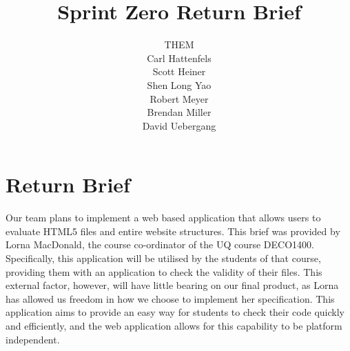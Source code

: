 \documentclass[12pt]{article}
\title{\bf Sprint Zero Return Brief}
\author{THEM \\ Carl Hattenfels \\ Scott Heiner \\ Shen Long Yao \\ Robert Meyer \\ Brendan Miller \\ David Uebergang}
\begin{document}
\maketitle

\section*{Return Brief}

Our team plans to implement a web based application that allows users to evaluate HTML5 files and entire website structures. This brief was provided by Lorna MacDonald, the course co-ordinator of the UQ course DECO1400. Specifically, this application will be utilised by the students of that course, providing them with an application to check the validity of their files. This external factor, however, will have little bearing on our final product, as Lorna has allowed us freedom in how we choose to implement her specification. This application aims to provide an easy way for students to check their code quickly and efficiently, and the web application allows for this capability to be platform independent.
\end{document}
